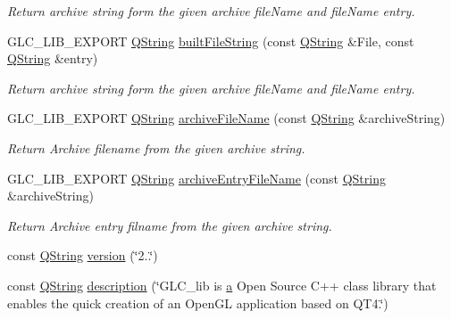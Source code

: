 \begin{DoxyCompactItemize}
\begin{DoxyCompactList}\small\item\em Return archive string form the given archive file\-Name and file\-Name entry. \end{DoxyCompactList}\item 
G\-L\-C\-\_\-\-L\-I\-B\-\_\-\-E\-X\-P\-O\-R\-T \hyperlink{group___u_a_v_objects_plugin_gab9d252f49c333c94a72f97ce3105a32d}{Q\-String} \hyperlink{namespaceglc_aa637d1f375d67226961e998398eb2ff9}{built\-File\-String} (const \hyperlink{group___u_a_v_objects_plugin_gab9d252f49c333c94a72f97ce3105a32d}{Q\-String} \&File, const \hyperlink{group___u_a_v_objects_plugin_gab9d252f49c333c94a72f97ce3105a32d}{Q\-String} \&entry)
\begin{DoxyCompactList}\small\item\em Return archive string form the given archive file\-Name and file\-Name entry. \end{DoxyCompactList}\item 
G\-L\-C\-\_\-\-L\-I\-B\-\_\-\-E\-X\-P\-O\-R\-T \hyperlink{group___u_a_v_objects_plugin_gab9d252f49c333c94a72f97ce3105a32d}{Q\-String} \hyperlink{namespaceglc_af2426e4539e56ae48e0059e1179b2564}{archive\-File\-Name} (const \hyperlink{group___u_a_v_objects_plugin_gab9d252f49c333c94a72f97ce3105a32d}{Q\-String} \&archive\-String)
\begin{DoxyCompactList}\small\item\em Return Archive filename from the given archive string. \end{DoxyCompactList}\item 
G\-L\-C\-\_\-\-L\-I\-B\-\_\-\-E\-X\-P\-O\-R\-T \hyperlink{group___u_a_v_objects_plugin_gab9d252f49c333c94a72f97ce3105a32d}{Q\-String} \hyperlink{namespaceglc_a3c470e760f059750602b32a4c0c7a1eb}{archive\-Entry\-File\-Name} (const \hyperlink{group___u_a_v_objects_plugin_gab9d252f49c333c94a72f97ce3105a32d}{Q\-String} \&archive\-String)
\begin{DoxyCompactList}\small\item\em Return Archive entry filname from the given archive string. \end{DoxyCompactList}\item 
const \hyperlink{group___u_a_v_objects_plugin_gab9d252f49c333c94a72f97ce3105a32d}{Q\-String} \hyperlink{namespaceglc_ae9c9d1f91a50ecbe6461acd72d4dcf12}{version} (\char`\"{}2..\char`\"{})
\item 
const \hyperlink{group___u_a_v_objects_plugin_gab9d252f49c333c94a72f97ce3105a32d}{Q\-String} \hyperlink{namespaceglc_af67c768c9d0ed98b8fecba911f26c204}{description} (\char`\"{}G\-L\-C\-\_\-lib is \hyperlink{glext_8h_ac8729153468b5dcf13f971b21d84d4e5}{a} Open Source C++ class library that enables the quick creation of an Open\-G\-L application based on Q\-T4.\char`\"{})

\end{DoxyCompactItemize}

